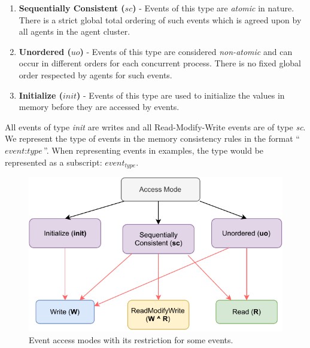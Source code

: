         \begin{enumerate}
            \item \textbf{Sequentially Consistent ($sc$)} - Events of this type are \textit{atomic} in nature\footnotemark. There is a strict global total ordering of such events which is agreed upon by all agents in the agent cluster. 
            
            \item \textbf{Unordered ($uo$)} - Events of this type are considered \textit{non-atomic} and can occur in different orders for each concurrent process. There is no fixed global order respected by agents for such events. 
            
            \item \textbf{Initialize ($init$)} - Events of this type are used to initialize the values in memory before they are accessed by events. 
        \end{enumerate}

        All events of type \textit{init} are writes and all Read-Modify-Write events are of type \textit{sc}.  
        We represent the type of events in the memory consistency rules in the format ``$\textit{event} : \textit{type}$''. 
        When representing events in examples, the type would be represented as a subscript: $\textit{event}_\textit{type}$. 
       
        \begin{figure}[H]
            \centering
            \includegraphics[scale=0.7]{3.ECMAScriptMemoryModel/AccessModes.pdf}
            \caption{Event access modes with its restriction for some events.}
        \end{figure}


